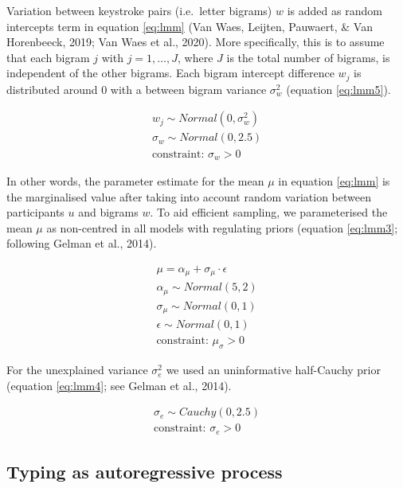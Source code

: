 \documentclass[
  english,
  man,mask,floatsintext]{apa7}
\begin{document}
Variation between keystroke pairs (i.e.~letter bigrams) \(w\) is added as random intercepts term in equation \ref{eq:lmm} (Van Waes, Leijten, Pauwaert, \& Van Horenbeeck, 2019; Van Waes et al., 2020). More specifically, this is to assume that each bigram \(j\) with \(j = 1, \dots, J\), where \(J\) is the total number of bigrams, is independent of the other bigrams. Each bigram intercept difference \(w_j\) is distributed around 0 with a between bigram variance \(\sigma_w^2\) (equation \ref{eq:lmm5}).

\[
\tag{3}
\begin{aligned}
w_j \sim Normal(0,\sigma_w^2)\\
\sigma_w \sim Normal(0,2.5)\\
\text{constraint: }\sigma_w >0 
\end{aligned}
\label{eq:lmm5}
\]

In other words, the parameter estimate for the mean \(\mu\) in equation \ref{eq:lmm} is the marginalised value after taking into account random variation between participants \(u\) and bigrams \(w\). To aid efficient sampling, we parameterised the mean \(\mu\) as non-centred in all models with regulating priors (equation \ref{eq:lmm3}; following Gelman et al., 2014).

\[
\tag{4}
\begin{aligned}
\mu = \alpha_{\mu} + \sigma_{\mu} \cdot \epsilon\\
\alpha_{\mu} \sim Normal(5,2)\\
\sigma_{\mu} \sim Normal(0,1)\\
\epsilon \sim Normal(0,1)\\
\text{constraint: }\mu_{\sigma}>0 
\end{aligned}
\label{eq:lmm3}
\]

For the unexplained variance \(\sigma_e^2\) we used an uninformative half-Cauchy prior (equation \ref{eq:lmm4}; see Gelman et al., 2014).

\[
\tag{5}
\begin{aligned}
\sigma_e \sim Cauchy(0,2.5)\\
\text{constraint: }\sigma_e>0 
\end{aligned}
\label{eq:lmm4}
\]

\hypertarget{typing-as-autoregressive-process}{%
\subsection{Typing as autoregressive process}\label{typing-as-autoregressive-process}}
\end{document}
